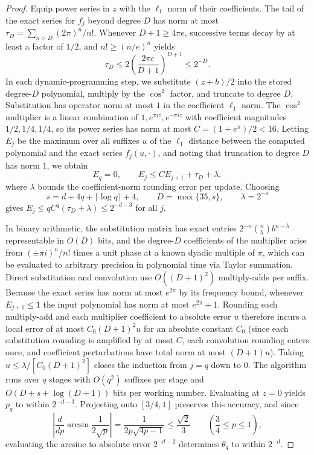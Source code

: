 \documentclass[11pt]{article}
\begin{document}
\begin{proof}
Equip power series in $z$ with the $\ell_1$ norm of their coefficients. The tail of the exact series for $f_j$ beyond degree $D$ has norm at most $\tau_D = \sum_{n > D} (2\pi)^n / n!$. Whenever $D + 1 \ge 4\pi e$, successive terms decay by at least a factor of $1/2$, and $n! \ge (n/e)^n$ yields
\[
\tau_D \le 2\left(\frac{2\pi e}{D+1}\right)^{D+1} \le 2^{-D}.
\]
In each dynamic-programming step, we substitute $(z+b)/2$ into the stored degree-$D$ polynomial, multiply by the $\cos^2$ factor, and truncate to degree $D$. Substitution has operator norm at most $1$ in the coefficient $\ell_1$ norm. The $\cos^2$ multiplier is a linear combination of $1, e^{\pi i z}, e^{-\pi i z}$ with coefficient magnitudes $1/2, 1/4, 1/4$, so its power series has norm at most $C = (1 + e^\pi)/2 < 16$. Letting $E_j$ be the maximum over all suffixes $u$ of the $\ell_1$ distance between the computed polynomial and the exact series $f_j(u, \cdot)$, and noting that truncation to degree $D$ has norm $1$, we obtain
\[
E_q = 0, \qquad E_j \le C E_{j+1} + \tau_D + \lambda,
\]
where $\lambda$ bounds the coefficient-norm rounding error per update. Choosing
\[
s = d + 4q + \lceil \log q \rceil + 4, \qquad D = \max\{35, s\}, \qquad \lambda = 2^{-s}
\]
gives $E_j \le q C^q (\tau_D + \lambda) \le 2^{-d-3}$ for all $j$.

In binary arithmetic, the substitution matrix has exact entries $2^{-n}\binom{n}{h}b^{n-h}$ representable in $O(D)$ bits, and the degree-$D$ coefficients of the multiplier arise from $(\pm \pi i)^n/n!$ times a unit phase at a known dyadic multiple of $\pi$, which can be evaluated to arbitrary precision in polynomial time via Taylor summation. Direct substitution and convolution use $O((D+1)^2)$ multiply-adds per suffix. Because the exact series has norm at most $e^{2\pi}$ by its frequency bound, whenever $E_{j+1} \le 1$ the input polynomial has norm at most $e^{2\pi} + 1$. Rounding each multiply-add and each multiplier coefficient to absolute error $u$ therefore incurs a local error of at most $C_0(D+1)^2 u$ for an absolute constant $C_0$ (since each substitution rounding is amplified by at most $C$, each convolution rounding enters once, and coefficient perturbations have total norm at most $(D+1)u$). Taking $u \le \lambda / [C_0(D+1)^2]$ closes the induction from $j = q$ down to $0$. The algorithm runs over $q$ stages with $O(q^2)$ suffixes per stage and $O(D + s + \log(D+1))$ bits per working number. Evaluating at $z = 0$ yields $p_q$ to within $2^{-d-3}$. Projecting onto $[3/4, 1]$ preserves this accuracy, and since
\[
\left|\frac{d}{dp}\arcsin\frac{1}{2\sqrt{p}}\right| = \frac{1}{2p\sqrt{4p-1}} \le \frac{\sqrt{2}}{3} \qquad \left(\frac{3}{4} \le p \le 1\right),
\]
evaluating the arcsine to absolute error $2^{-d-2}$ determines $\theta_q$ to within $2^{-d}$.
\end{proof}
\end{document}

